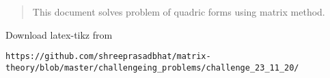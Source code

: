 \documentclass[journal,12pt,twocolumn]{IEEEtran}
\begin{document}
% 
\maketitle
\newpage
\bigskip
\renewcommand{\thefigure}{\theenumi}
\renewcommand{\thetable}{\theenumi}

%
%
\begin{abstract}
This document solves problem of quadric forms using matrix method.
\end{abstract}
Download latex-tikz from
\begin{lstlisting}
https://github.com/shreeprasadbhat/matrix-theory/blob/master/challengeing_problems/challenge_23_11_20/
\end{lstlisting}
%
\end{document}
